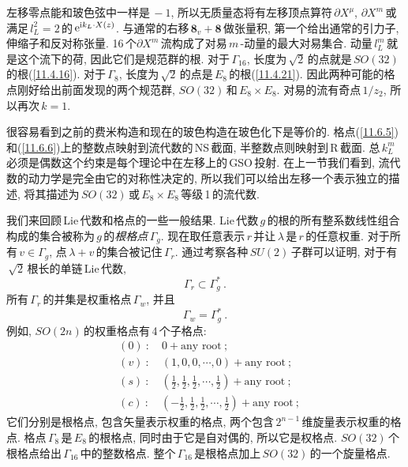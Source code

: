 左移零点能和玻色弦中一样是$\,-1$, 所以无质量态将有左移顶点算符$\,\partial X^{\mu}$, $\partial X^{m}\,$或满足$\,l_{L}^{2}=2\,$的$\,\mathrm{e}^{\mathrm{i} k_{L}\cdot X(z)}$.  与通常的右移$\,\mathbf{8}_{v}+\mathbf{8}\,$做张量积, 第一个给出通常的引力子, 伸缩子和反对称张量. 16\,个$\partial X^{m}\,$流构成了对易$\,m\,$-动量的最大对易集合. 动量$\,l_{L}^{m}\,$就是这个流下的荷, 因此它们是规范群的根. 对于$\,\Gamma_{16}$, 长度为$\,\sqrt{2}\,$的点就是$\,SO(32)\,$的根(\ref{11.4.16}). 对于$\,\Gamma_{8}$, 长度为$\,\sqrt{2}\,$的点是$\,E_{8}\,$的根(\ref{11.4.21}). 因此两种可能的格点刚好给出前面发现的两个规范群, $SO(32)\,$和$\,E_{8}\times E_{8}$. 对易的流有奇点$\,1/z_{2}$, 所以再次$\,k=1$.

很容易看到之前的费米构造和现在的玻色构造在玻色化下是等价的. 格点(\ref{11.6.5})和(\ref{11.6.6})上的整数点映射到流代数的\,NS\,截面, 半整数点则映射到\,R\,截面. 总$\,k_{L}^{m}\,$必须是偶数这个约束是每个理论中在左移上的\,GSO\,投射. 在上一节我们看到, 流代数的动力学是完全由它的对称性决定的, 所以我们可以给出左移一个表示独立的描述, 将其描述为\,$SO(32)\,$或$\,E_{8}\times E_{8}\,$等级\,1\,的流代数.

我们来回顾\,Lie\,代数和格点的一些一般结果. Lie\,代数$\,g\,$的根的所有整系数线性组合构成的集合被称为$\,g\,$的{\emph{根格点}}$\,\Gamma_{g}$. 现在取任意表示$\,r\,$并让$\,\lambda\,$是$\,r\,$的任意权重. 对于所有$\,v\in\Gamma_{g}$, 点$\,\lambda+v\,$的集合被记住$\,\Gamma_{r}$. 通过考察各种$\,SU(2)\,$子群可以证明, 对于有$\,\sqrt{2}\,$根长的单链\,Lie\,代数,
\begin{equation}
    \Gamma_{r} \subset \Gamma_{g}^{\ast} \:. \label{11.6.7}
\end{equation}
所有$\,\Gamma_{r}\,$的并集是权重格点$\,\Gamma_{w}$, 并且
\begin{equation}
    \Gamma_{w}=\Gamma_{g}^{\ast} \:.
\end{equation}
例如, $SO(2n)\,$的权重格点有\,4\,个子格点:
\begin{subequations}
\begin{align}
     &(0)\::\quad 0+\text{any root}\:; \label{11.6.9a} \\
     &(v)\::\quad (1,0,0,\cdots,0)+\text{any root}\:; \label{11.6.9b} \\
     &(s)\::\quad (\tfrac{1}{2},\tfrac{1}{2},\tfrac{1}{2},\cdots,\tfrac{1}{2})+\text{any root}\:; \label{11.6.9c} \\
     &(c)\::\quad (-\tfrac{1}{2},\tfrac{1}{2},\tfrac{1}{2},\cdots,\tfrac{1}{2})+\text{any root}\:; \label{11.6.9d} 
\end{align} \label{11.6.9}
\end{subequations}
它们分别是根格点, 包含矢量表示权重的格点, 两个包含$\,2^{n-1}\,$维旋量表示权重的格点.  格点$\,\Gamma_{8}\,$是$\,E_{8}\,$的根格点, 同时由于它是自对偶的, 所以它是权格点. $SO(32)\,$个根格点给出$\,\Gamma_{16}\,$中的整数格点. 整个$\,\Gamma_{16}\,$是根格点加上$\,SO(32)\,$的一个旋量格点.

